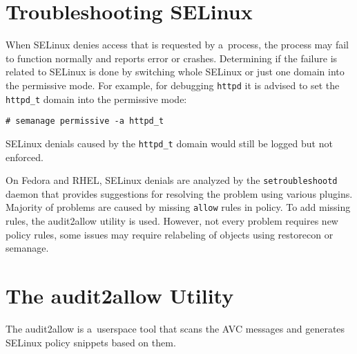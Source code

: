 \section{Troubleshooting SELinux}

When SELinux denies access that is requested by a~process, the process may fail
to function normally and reports error or crashes. Determining if the failure is
related to SELinux is done by switching whole SELinux or just one domain into
the permissive mode. For example, for debugging \texttt{httpd} it is advised to
set the \texttt{httpd\_t} domain into the permissive mode:
\begin{lstlisting}
# semanage permissive -a httpd_t
\end{lstlisting}
SELinux denials caused by the \texttt{httpd\_t} domain would still be logged but
not enforced.

On Fedora and RHEL, SELinux denials are analyzed by the \texttt{setroubleshootd}
daemon that provides suggestions for resolving the problem using various
plugins. Majority of problems are caused by missing \texttt{allow} rules in
policy. To add missing rules, the audit2allow utility is used. However, not
every problem requires new policy rules, some issues may require relabeling of
objects using restorecon or semanage.

\section{The audit2allow Utility}
\label{audit2allow}
The audit2allow is a~userspace tool that scans the AVC messages and generates
SELinux policy snippets based on them.

